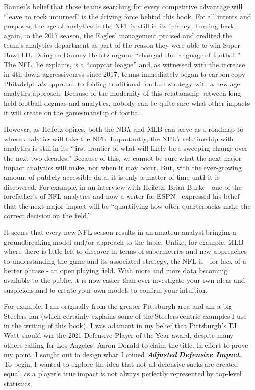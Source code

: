 \documentclass[
  letterpaper,
]{krantz}
\begin{document}
Banner's belief that those teams searching for every competitive
advantage will ``leave no rock unturned'' is the driving force behind
this book. For all intents and purposes, the age of analytics in the NFL
is still in its infancy. Turning back, again, to the 2017 season, the
Eagles' management praised and credited the team's analytics department
as part of the reason they were able to win Super Bowl LII. Doing so
Danney Heifetz argues, ``changed the language of football.'' The NFL, he
explains, is a ``copycat league'' and, as witnessed with the increase in
4th down aggressiveness since 2017, teams immediately began to carbon
copy Philadelphia's approach to folding traditional football strategy
with a new age analytics approach. Because of the modernity of this
relationship between long-held football dogmas and analytics, nobody can
be quite sure what other impacts it will create on the gamesmanship of
football.

However, as Heifetz opines, both the NBA and MLB can serve as a roadmap
to where analytics will take the NFL. Importantly, the NFL's
relationship with analytics is still in its ``first frontier of what
will likely be a sweeping change over the next two decades.'' Because of
this, we cannot be sure what the next major impact analytics will make,
nor when it may occur. But, with the ever-growing amount of publicly
accessible data, it is only a matter of time until it is discovered. For
example, in an interview with Heifetz, Brian Burke - one of the
forefather's of NFL analytics and now a writer for ESPN - expressed his
belief that the next major impact will be ``quantifying how often
quarterbacks make the correct decision on the field.''

It seems that every new NFL season results in an amateur analyst
bringing a groundbreaking model and/or approach to the table. Unlike,
for example, MLB where there is little left to discover in terms of
sabermetrics and new approaches to understanding the game and its
associated strategy, the NFL is - for lack of a better phrase - an open
playing field. With more and more data becoming available to the public,
it is now easier than ever investigate your own ideas and suspicions and
to create your own models to confirm your intuition.

For example, I am originally from the greater Pittsburgh area and am a
big Steelers fan (which certainly explains some of the Steelers-centric
examples I use in the writing of this book). I was adamant in my belief
that Pittsburgh's TJ Watt should win the 2021 Defensive Player of the
Year award, despite many others calling for Los Angeles' Aaron Donald to
claim the title. In effort to prove my point, I sought out to design
what I coined \textbf{\emph{Adjusted Defensive Impact}}. To begin, I
wanted to explore the idea that not all defensive sacks are created
equal, as a player's true impact is not always perfectly represented by
top-level statistics.
\end{document}
